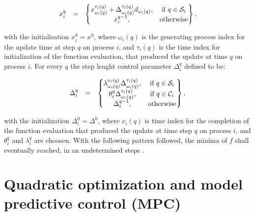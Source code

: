 	\begin{equation}
        \begin{array}{rcl}
            x_i^q&=&\begin{Bmatrix}
                x_{\omega_i(q)}^{\tau_i(q)}+\Delta_{\omega_i(q)}^{\tau_i(q)}d_{\omega_i(q)},&\textnormal{if }q\in\mathcal{S}_i\\
                x_i^{q-1},&\textnormal{otherwise}\\
            \end{Bmatrix},\\
        \end{array}
        \label{BSIC:equ:APPS_x}
    \end{equation}
		
		with the initialisation $x^0_i=x^0$, where $\omega_i(q)$ is the generating process index for the update time at step $q$ on process $i$, and $\tau_i(q)$ is the time index for initialization of the function evaluation, that produced the update at time $q$ on process $i$. For every $q$ the step lenght control parameter $\Delta_i^q$ defined to be:
		
		\begin{equation}
        \begin{array}{rcl}
            \Delta_i^q&=&\begin{Bmatrix}
                \lambda_{\omega_i(q)}^{\nu_i(q)}\Delta_{\omega_i(q)}^{\tau_i(q)},&\textnormal{if }q\in\mathcal{S}_i\\
								\theta_{i}^{q}\Delta_{\omega_i(q)}^{\tau_i(q)},&\textnormal{if }q\in\mathcal{C}_i\\
                \Delta_i^{q-1},&\textnormal{otherwise}\\
            \end{Bmatrix},\\
        \end{array}
        \label{BSIC:equ:APPS_Delta}
    \end{equation}
		
		with the initialization $\Delta^0_i=\Delta^0$, where $\nu_i(q)$ is  time index for the completion of the function evaluation that produced the update at time step $q$ on process $i$, and $\theta_i^q$ and $\lambda_i^q$ are choosen. With the following pattern followed, the minima of $f$ shall eventually reached, in an undetermined steps \cite{kolda2003understanding}.

\section{Quadratic optimization and model predictive control (MPC)}\label{BASICCSR:sec:MPC}


